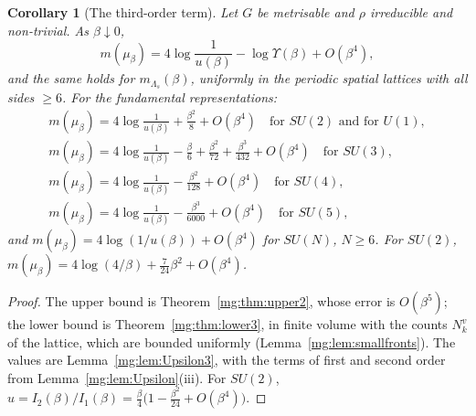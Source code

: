 \documentclass[11pt,a4paper]{article}
\newtheorem{corollary}[theorem]{Corollary}
\theoremstyle{definition}
\theoremstyle{remark}
\begin{document}
\begin{corollary}[The third-order term]\label{mg:cor:third}
Let $G$ be metrisable and $\rho$ irreducible and non-trivial. As $\beta\downarrow0$,
\[
m(\mu_\beta)=4\log\frac1{u(\beta)}-\log\Upsilon(\beta)+O(\beta^4),
\]
and the same holds for $m_{\Lambda_s}(\beta)$, uniformly in the periodic spatial lattices with all sides $\ge6$. For the fundamental representations:
\begin{gather*}
m(\mu_\beta)=4\log\frac1{u(\beta)}+\frac{\beta^2}8+O(\beta^4)\quad\text{for $SU(2)$ and for $U(1)$},\\
m(\mu_\beta)=4\log\frac1{u(\beta)}-\frac\beta6+\frac{\beta^2}{72}+\frac{\beta^3}{432}+O(\beta^4)\quad\text{for $SU(3)$},\\
m(\mu_\beta)=4\log\frac1{u(\beta)}-\frac{\beta^2}{128}+O(\beta^4)\quad\text{for $SU(4)$},\\
m(\mu_\beta)=4\log\frac1{u(\beta)}-\frac{\beta^3}{6000}+O(\beta^4)\quad\text{for $SU(5)$},
\end{gather*}
and $m(\mu_\beta)=4\log(1/u(\beta))+O(\beta^4)$ for $SU(N)$, $N\ge6$. For $SU(2)$, $m(\mu_\beta)=4\log(4/\beta)+\frac7{24}\beta^2+O(\beta^4)$.
\end{corollary}

\begin{proof}
The upper bound is Theorem~\ref{mg:thm:upper2}, whose error is $O(\beta^5)$; the lower bound is Theorem~\ref{mg:thm:lower3}, in finite volume with the counts
$N^v_k$ of the lattice, which are bounded uniformly (Lemma~\ref{mg:lem:smallfronts}). The values are Lemma~\ref{mg:lem:Upsilon3}, with the terms of first and
second order from Lemma~\ref{mg:lem:Upsilon}(iii). For $SU(2)$, $u=I_2(\beta)/I_1(\beta)=\frac\beta4\bigl(1-\frac{\beta^2}{24}+O(\beta^4)\bigr)$.
\end{proof}
\end{document}
